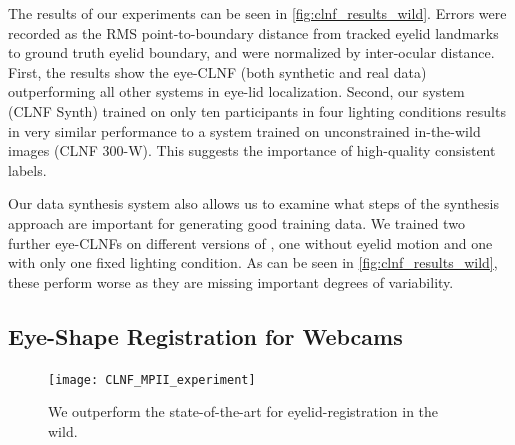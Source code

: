 The results of our experiments can be seen in \autoref{fig:clnf_results_wild}. 
Errors were recorded as the RMS point-to-boundary distance from tracked eyelid landmarks to ground truth eyelid boundary, and were normalized by inter-ocular distance. 
First, the results show the eye-CLNF (both synthetic and real data) outperforming all other systems in eye-lid localization. 
Second, our system (CLNF Synth) trained on only ten participants in four lighting conditions results in very similar performance to a system trained on unconstrained in-the-wild images (CLNF 300-W). This suggests the importance of high-quality consistent labels.

Our data synthesis system also allows us to examine what steps of the synthesis approach are important for generating good training data. We trained two further eye-CLNFs on different versions of \dataset, one without eyelid motion and one with only one fixed lighting condition. As can be seen in \autoref{fig:clnf_results_wild}, these perform worse as they are missing important degrees of variability.

\subsection{Eye-Shape Registration for Webcams}




\begin{figure}
    \centering
    \texttt{[image: CLNF\_MPII\_experiment]}
    \caption{We outperform the state-of-the-art for eyelid-registration in the wild.}
    \label{fig:clnf_results_MPII}
\end{figure}

